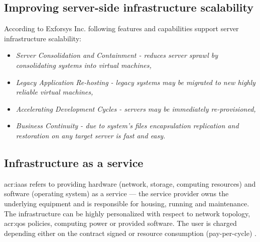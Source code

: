 \documentclass[11pt]{book}
\begin{document}
        




      \subsection{Improving server-side infrastructure scalability}

        According to Exforsys Inc. following features and capabilities support server infrastructure scalability:
	
	\begin{itemize}
		\item \textit{Server Consolidation and Containment  - reduces  server sprawl by 
			consolidating systems into virtual machines,}

		\item \textit{Legacy Application Re-hosting - legacy systems may be migrated to new highly reliable virtual machines,}

		\item \textit{Accelerating Development Cycles - servers may be immediately re-provisioned,}

		\item \textit{Business Continuity - due to system's files encapsulation replication 
			and restoration on any target server is fast and easy. \cite{vib}}

	\end{itemize}


      \subsection{Infrastructure as a service}

        \gls{acr:iaas} refers to providing hardware (network, storage, computing resources) and software (operating
        system) as a service --- the service provider owns the underlying equipment and is responsible for housing,
        running and maintenance. The infrastructure can be highly personalized with respect to network topology,
        \gls{acr:qos} policies, computing power or provided software. The user is charged depending either on the
        contract signed or resource consumption (pay-per-cycle) \cite{iaas}.
\end{document}
